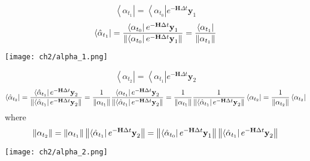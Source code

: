 \begin{definition}
\begin{equation}
        \left< \alpha_{t_1} \right| = \left< \alpha_{t_0} \right| e^{-\textbf{H} \Delta t} \textbf{y}_1     
\end{equation}
\begin{equation}
        \left< \hat{\alpha}_{t_1} \right| = \frac{\left< \alpha_{t_0} \right| e^{-\textbf{H}\Delta t} \textbf{y}_1}{\left\lVert\left< \alpha_{t_0} \right| e^{-\textbf{H}\Delta t} \textbf{y}_1\right\rVert} = \frac{\left< \alpha_{t_{1}} \right|}{\left\lVert\alpha_{t_{1}}\right\rVert}
\end{equation}
\begin{center}
        \texttt{[image: ch2/alpha\_1.png]}   
\end{center}
\end{definition}

\begin{definition}
\begin{equation}
        \left< \alpha_{t_2} \right| = \left< \alpha_{t_1} \right| e^{-\textbf{H}\Delta t} \textbf{y}_2     
\end{equation}
\begin{equation}
        \left< \hat{\alpha}_{t_2} \right| 
	= \frac{\left< \hat{\alpha}_{t_1} \right| e^{-\textbf{H}\Delta t} \textbf{y}_2}{\left\lVert\left< \hat{\alpha}_{t_1} \right| e^{-\textbf{H}\Delta t} \textbf{y}_2\right\rVert} 
	= \frac{1}{\left\lVert\alpha_{t_{1}}\right\rVert} \frac{\left< \alpha_{t_1} \right| e^{-\textbf{H}\Delta t} \textbf{y}_2}{\left\lVert\left< \hat{\alpha}_{t_1} \right| e^{-\textbf{H}\Delta t} \textbf{y}_2\right\rVert} 
	= \frac{1}{\left\lVert\alpha_{t_{1}}\right\rVert} \frac{1}{\left\lVert\left< \hat{\alpha}_{t_1} \right| e^{-\textbf{H}\Delta t} \textbf{y}_2\right\rVert} \left< \alpha_{t_2} \right| 
	= \frac{1}{\left\lVert\alpha_{t_2}\right\rVert} \left< \alpha_{t_2} \right|
\end{equation}
where
\begin{equation}
        \left\lVert\alpha_{t_2}\right\rVert = \left\lVert\alpha_{t_{1}}\right\rVert \left\lVert\left< \hat{\alpha}_{t_1} \right| e^{-\textbf{H}\Delta t} \textbf{y}_2\right\rVert 
	= \left\lVert\left < \hat{\alpha}_{t_{0}} \right| e^{-\textbf{H}\Delta t} \textbf{y}_1\right\rVert \left\lVert\left< \hat{\alpha}_{t_1} \right| e^{-\textbf{H}\Delta t} \textbf{y}_2\right\rVert
\end{equation}
\begin{center}
        \texttt{[image: ch2/alpha\_2.png]}   
\end{center}
\end{definition}

